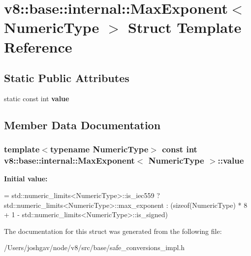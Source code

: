\hypertarget{structv8_1_1base_1_1internal_1_1_max_exponent}{}\section{v8\+:\+:base\+:\+:internal\+:\+:Max\+Exponent$<$ Numeric\+Type $>$ Struct Template Reference}
\label{structv8_1_1base_1_1internal_1_1_max_exponent}
\subsection*{Static Public Attributes}
\begin{DoxyCompactItemize}
\item 
static const int {\bfseries value}
\end{DoxyCompactItemize}


\subsection{Member Data Documentation}
\subsubsection[{\texorpdfstring{value}{value}}]{\setlength{\rightskip}{0pt plus 5cm}template$<$typename Numeric\+Type$>$ const int {\bf v8\+::base\+::internal\+::\+Max\+Exponent}$<$ Numeric\+Type $>$\+::value\hspace{0.3cm}{\ttfamily [static]}}\hypertarget{structv8_1_1base_1_1internal_1_1_max_exponent_a22031aba42b35e71cb34d9e9272a7c98}{}\label{structv8_1_1base_1_1internal_1_1_max_exponent_a22031aba42b35e71cb34d9e9272a7c98}
{\bfseries Initial value\+:}
\begin{DoxyCode}
= std::numeric\_limits<NumericType>::is\_iec559
                               ? std::numeric\_limits<NumericType>::max\_exponent
                               : (\textcolor{keyword}{sizeof}(NumericType) * 8 + 1 -
                                  std::numeric\_limits<NumericType>::is\_signed)
\end{DoxyCode}


The documentation for this struct was generated from the following file\+:\begin{DoxyCompactItemize}
\item 
/\+Users/joshgav/node/v8/src/base/safe\+\_\+conversions\+\_\+impl.\+h\end{DoxyCompactItemize}

